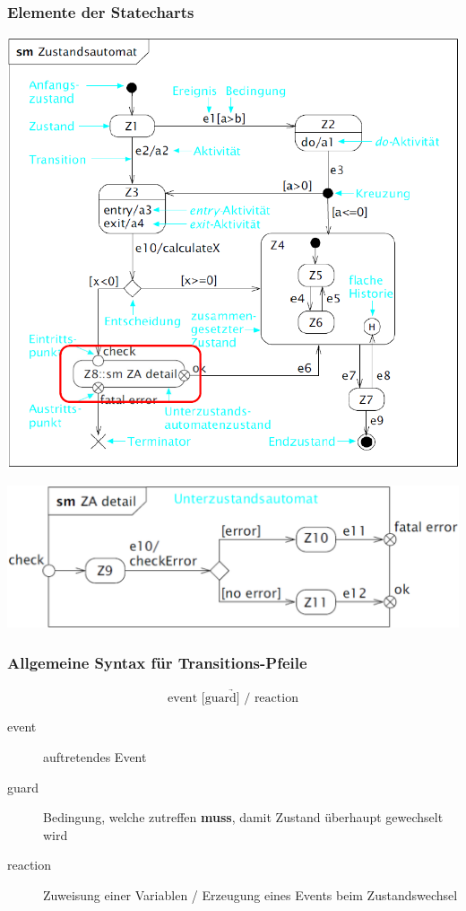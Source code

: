 \subsubsection{Elemente der Statecharts}

\begin{center}
    \includegraphics[width=0.7\columnwidth]{images/statechart_overview.png}

    \vspace{0.2cm}

    \includegraphics[width=0.6\columnwidth]{images/statechart_overview_submachine.png}
\end{center}


\subsubsection{Allgemeine Syntax für Transitions-Pfeile}

\vspace{-0.2cm}

$$ \underrightarrow{\text{event [guard] / reaction}} $$

\begin{description}
    \item[event] auftretendes Event
    \item[guard] Bedingung, welche zutreffen \textbf{muss}, damit Zustand überhaupt gewechselt wird 
    \item[reaction] Zuweisung einer Variablen / Erzeugung eines Events beim Zustandswechsel 
\end{description}


